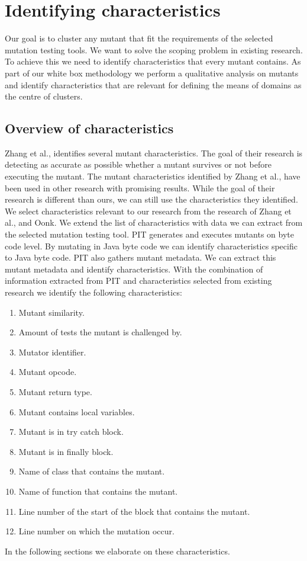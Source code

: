 \documentclass[../../main]{subfiles}
\begin{document}
\section{Identifying characteristics}
\label{ch:identifying_characteristics}
Our goal is to cluster any mutant that fit the requirements of the selected mutation testing tools.
We want to solve the scoping problem in existing research\cite{Ji2009,Wilinski2015,Ma2016,Wei2021SpectralTesting}.
To achieve this we need to identify characteristics that every mutant contains. 
As part of our white box methodology we perform a qualitative analysis on mutants and identify characteristics that are relevant for defining the means of domains as the centre of clusters. 

\subsection{Overview of characteristics}
Zhang et al., identifies several mutant characteristics\cite{Zhang2019PredictiveTesting}. 
The goal of their research is detecting as accurate as possible whether a mutant survives or not before executing the mutant.
The mutant characteristics identified by Zhang et al., have been used in other research with promising results\cite{Oonk2021}.
While the goal of their research is different than ours, we can still use the characteristics they identified.
We select characteristics relevant to our research from the research of Zhang et al., and Oonk\cite{Oonk2021}.
We extend the list of characteristics with data we can extract from the selected mutation testing tool. 
\newline
PIT generates and executes mutants on byte code level\cite{pitestBytecode}.
By mutating in Java byte code we can identify characteristics specific to Java byte code.
PIT also gathers mutant metadata.
We can extract this mutant metadata and identify characteristics. 
With the combination of information extracted from PIT and characteristics selected from existing research we identify the following characteristics:
\begin{enumerate}
    \item Mutant similarity.
    \item Amount of tests the mutant is challenged by.
    \item Mutator identifier.
    \item Mutant opcode.
    \item Mutant return type.
    \item Mutant contains local variables.
    \item Mutant is in try catch block.
    \item Mutant is in finally block.
    \item Name of class that contains the mutant.
    \item Name of function that contains the mutant.
    \item Line number of the start of the block that contains the mutant.
    \item Line number on which the mutation occur.
\end{enumerate}
In the following sections we elaborate on these characteristics.
\end{document}
